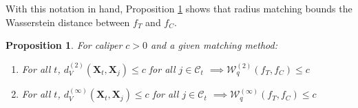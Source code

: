 \documentclass{article}
\newtheorem{proposition}[theorem]{Proposition}
\newcommand{\Xt}{\mathbf{X}_t}
\newcommand{\Xj}{\mathbf{X}_j}
\newcommand{\Ct}{\mathcal{C}_{t}}
\begin{document}

With this notation in hand, Proposition \ref{prop:wass} shows that radius matching bounds the Wasserstein distance between $f_T$ and $f_C$.

\begin{proposition}
\label{prop:wass}
    For caliper $c > 0$ and a given matching method:
    \begin{enumerate}[label=(\alph*)]
        \item For all $t$, $d^{(2)}_V(\Xt, \Xj) \leq c$ for all $j \in \Ct$
            $\implies \mathcal{W}^{(2)}_q(f_T, f_C) \leq c$
        \item For all $t$, $d^{(\infty)}_V(\Xt, \Xj) \leq c$ for all $j \in \Ct$
            $\implies \mathcal{W}^{(\infty)}_q(f_T, f_C) \leq c$
    \end{enumerate}
\end{proposition}
\end{document}
